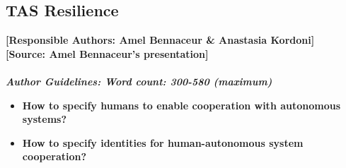 \documentclass[sigconf]{acmart}
\begin{document}
\subsection{TAS Resilience}
\noindent\textbf{[Responsible Authors:  Amel Bennaceur \& Anastasia Kordoni]}\\
\noindent\textbf{[Source: Amel Bennaceur's presentation]}\\\\
\noindent\textbf{\textit{Author Guidelines: Word count: 300-580 (maximum)}}\\
\begin{itemize}
	\item \textbf{How to specify humans to enable cooperation with autonomous systems?}
	\item \textbf{How to specify identities for human-autonomous system cooperation?}
\end{itemize}
%
%
\end{document}
